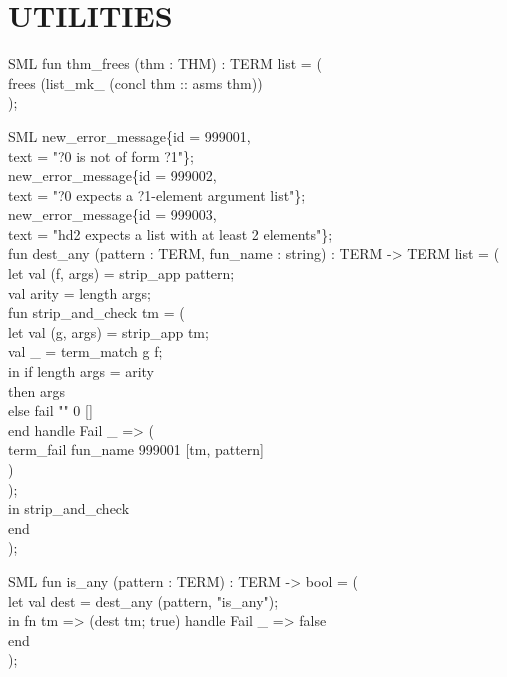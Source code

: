 \documentclass[11pt,a4paper]{article}
\begin{document}
\section{UTILITIES}
\begin{GFT}{SML}
\+fun \PrNL{}thm\_frees\PrNN{} (thm : THM) : TERM list = (\\
\+	frees (list\_mk\_\PrLB{} (concl thm :: asms thm))\\
\+);\\
\end{GFT}
\begin{GFT}{SML}
\+new\_error\_message\{id = 999001,\\
\+	text = "?0 is not of form ?1"\};\\
\+new\_error\_message\{id = 999002,\\
\+	text = "?0 expects a ?1-element argument list"\};\\
\+new\_error\_message\{id = 999003,\\
\+	text = "hd2 expects a list with at least 2 elements"\};\\
\+fun \PrNL{}dest\_any\PrNN{} (pattern : TERM, fun\_name : string) : TERM -> TERM list = (\\
\+	let	val (f, args) = strip\_app pattern;\\
\+		val arity = length args;\\
\+		fun strip\_and\_check tm = (\\
\+			let	val (g, args) = strip\_app tm;\\
\+				val \_ = term\_match g f;\\
\+			in	if	length args = arity\\
\+				then	args\\
\+				else	fail "" 0 []\\
\+			end	handle Fail \_ => (\\
\+				term\_fail fun\_name 999001 [tm, pattern]\\
\+			)\\
\+		);\\
\+	in	strip\_and\_check\\
\+	end\\
\+);\\
\end{GFT}
\begin{GFT}{SML}
\+fun \PrNL{}is\_any\PrNN{} (pattern : TERM) : TERM -> bool = (\\
\+	let	val dest = dest\_any (pattern, "is\_any");\\
\+	in	fn tm => (dest tm; true) handle Fail \_ => false\\
\+	end\\
\+);\\
\end{GFT}
\end{document}
